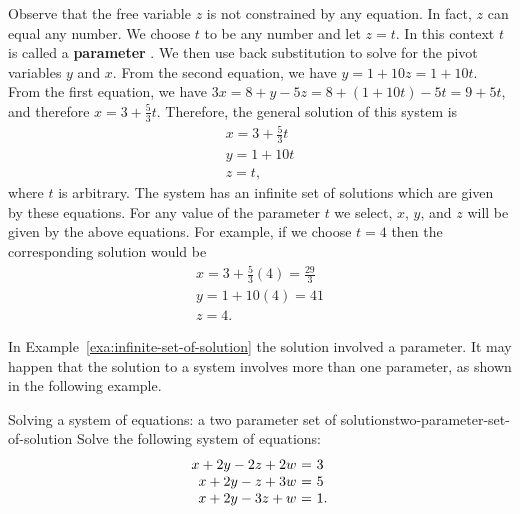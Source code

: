 \begin{solution}
  Observe that the free variable $z$ is not constrained by any
  equation. In fact, $z$ can equal any number. We choose $t$ to be any
  number and let $z = t$.  In this context $t$ is called a
  \textbf{parameter}%
  . We then use back substitution to solve for the
  pivot variables $y$ and $x$. From the second equation, we have
  $y = 1+10z = 1+10t$. From the first equation, we have
  $3x = 8+y-5z = 8+(1+10t)-5t = 9+5t$, and therefore
  $x=3+\frac{5}{3}t$. Therefore, the general solution of this system
  is
  \begin{equation*}
    \begin{array}{l}
      x=3+\frac{5}{3}t \\
      y=1+10t \\
      z=t,
    \end{array}
  \end{equation*}
  where $t$ is arbitrary. The system has an infinite set of solutions
  which are given by these equations. For any value of the parameter
  $t$ we select, $x$, $y$, and $z$ will be given by the above
  equations. For example, if we choose $t=4$ then the corresponding
  solution would be
  \begin{equation*}
    \begin{array}{l}
      x = 3 + \frac{5}{3}(4) = \frac{29}{3} \\
      y = 1+10(4) = 41 \\
      z = 4.
    \end{array}
  \end{equation*}
\end{solution}

In Example~\ref{exa:infinite-set-of-solution} the solution involved a
parameter. It may happen that the solution to a system involves more
than one parameter, as shown in the following example.

\begin{example}{Solving a system of equations: a two parameter set of solutions}{two-parameter-set-of-solution}
  Solve the following system of equations:
  \begin{equation*}
    \begin{array}{r@{~}c@{~}l}
      x + 2y - 2z + 2w &=& 3 \\
      x + 2y - z  + 3w &=& 5 \\
      x + 2y - 3z + w &=& 1.
    \end{array}
  \end{equation*}
\end{example}

